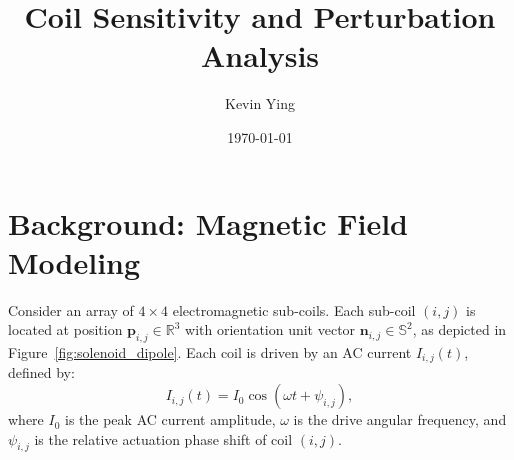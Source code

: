 \documentclass[11pt, a4paper]{article}
\title{\textbf{Coil Sensitivity and Perturbation Analysis}}
\author{Kevin Ying}
\date{\today}
\begin{document}
\maketitle

\section{Background: Magnetic Field Modeling}

Consider an array of $4 \times 4$ electromagnetic sub-coils. Each sub-coil $(i,j)$ is located at position $\mathbf{p}_{i,j} \in \mathbb{R}^3$ with orientation unit vector $\mathbf{n}_{i,j} \in \mathbb{S}^2$, as depicted in Figure~\ref{fig:solenoid_dipole}. Each coil is driven by an AC current $I_{i,j}(t)$, defined by:
\begin{equation}
    I_{i,j}(t) = I_0 \cos(\omega t + \psi_{i,j}),
\end{equation}
where $I_0$ is the peak AC current amplitude, $\omega$ is the drive angular frequency, and $\psi_{i,j}$ is the relative actuation phase shift of coil $(i,j)$.
\end{document}

